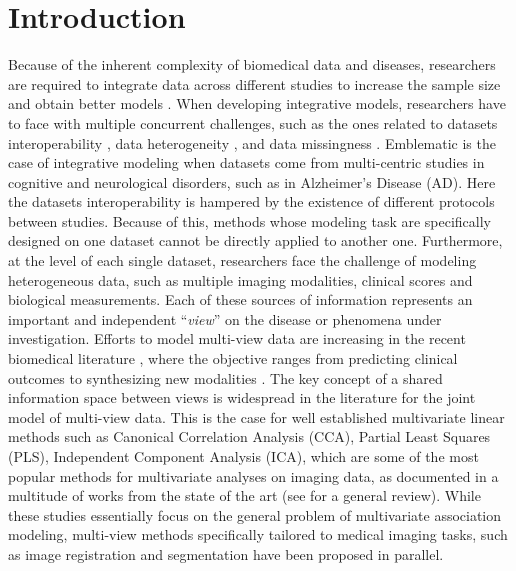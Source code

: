 \section{Introduction}

Because of the inherent complexity of biomedical data and diseases,
researchers are required to integrate data across different studies to increase the sample size and obtain better models \citep{LeSueur2020}.
%
When developing integrative models, researchers have to face with multiple concurrent challenges, such as the ones related to
datasets interoperability \citep{Tognin2020},
data heterogeneity \citep{Buch2020},
and data missingness \citep{GolrizKhatami2020}.
%
Emblematic is the case of integrative modeling when datasets come from multi-centric studies in cognitive and neurological disorders,
such as in Alzheimer's Disease (AD).
%
Here the datasets interoperability is hampered by the existence of different protocols between studies.
Because of this, methods whose modeling task are specifically designed on one dataset cannot be directly applied to another one.
	Furthermore, at the level of each single dataset, researchers face the challenge of modeling heterogeneous data,
	such as multiple imaging modalities, clinical scores and biological measurements.
	Each of these sources of information represents an important and independent ``\textit{view}'' on the disease or phenomena under investigation.
Efforts to model multi-view data are increasing in the recent biomedical literature \citep{Vieira2020,Venugopalan2021},
where the objective ranges from predicting clinical outcomes \citep{Chen2019,AbiNader2020,Tabarestani2020}
to synthesizing new modalities \citep{Wei2019, Wei2020, Zhou2020}.
The key concept of a shared information space between views is widespread in the literature for the joint model of multi-view data.
%
This is the case for well established multivariate linear methods such as
Canonical Correlation Analysis (CCA),
Partial Least Squares (PLS),
Independent Component Analysis (ICA),
which are some of the most popular methods for multivariate analyses on imaging data, as documented in a multitude of works from the state of the art (see \cite{Liu2014} for a general review).
	 While these studies essentially focus on the general problem of multivariate association modeling, multi-view methods specifically tailored to medical imaging tasks, such as image registration and segmentation have been proposed in parallel.
